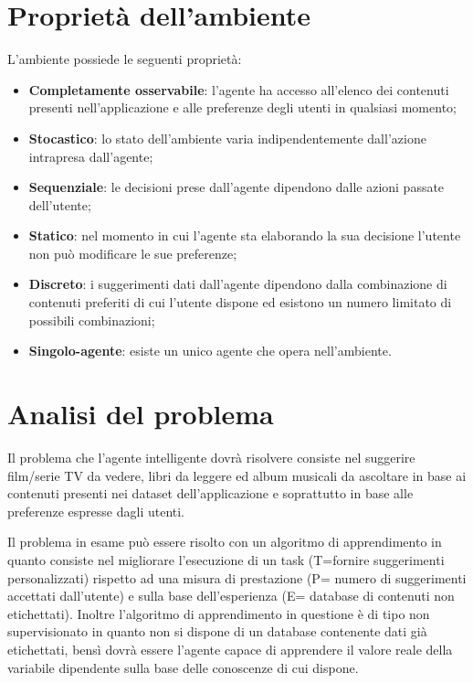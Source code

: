 \documentclass[a4paper, 12pt]{report}
\begin{document}
        \section{Proprietà dell'ambiente}\label{sec:proprieta-dell'ambiente}
            L’ambiente possiede le seguenti proprietà:
                \begin{itemize}
                    \item \textbf{Completamente osservabile}: l’agente ha accesso all’elenco dei contenuti presenti nell’applicazione
                    e alle preferenze degli utenti in qualsiasi momento;
                    \item \textbf{Stocastico}: lo stato dell’ambiente varia indipendentemente dall’azione intrapresa dall’agente;
                    \item \textbf{Sequenziale}: le decisioni prese dall’agente dipendono dalle azioni passate dell’utente;
                    \item \textbf{Statico}: nel momento in cui l’agente sta elaborando la sua decisione l’utente non può modificare
                    le sue preferenze;
                    \item \textbf{Discreto}: i suggerimenti dati dall’agente dipendono dalla combinazione di contenuti preferiti di cui
                    l’utente dispone ed esistono un numero limitato di possibili combinazioni;
                    \item \textbf{Singolo-agente}: esiste un unico agente che opera nell’ambiente.
                \end{itemize}

        \section{Analisi del problema}\label{sec:analisi-del-problema}
            Il problema che l’agente intelligente dovrà risolvere consiste nel suggerire film/serie TV da vedere,
            libri da leggere ed album musicali da ascoltare in base ai contenuti presenti nei dataset dell’applicazione
            e soprattutto in base alle preferenze espresse dagli utenti.

            Il problema in esame può essere risolto con un algoritmo di apprendimento in quanto consiste nel migliorare
            l’esecuzione di un task (T=fornire suggerimenti personalizzati) rispetto ad una misura di prestazione
            (P= numero di suggerimenti accettati dall’utente) e sulla base dell’esperienza (E= database di contenuti non
            etichettati).
            Inoltre l’algoritmo di apprendimento in questione è di tipo non supervisionato in quanto non si dispone di un
            database contenente dati già etichettati, bensì dovrà essere l’agente capace di apprendere il valore reale
            della variabile dipendente sulla base delle conoscenze di cui dispone.
\end{document}
